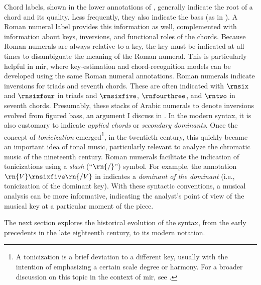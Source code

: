 

Chord labels, shown in the lower annotations of
, generally indicate the root of a chord and
its quality. Less frequently, they also indicate the bass
(as in ). A Roman numeral label provides
this information as well, complemented with information
about keys, inversions, and functional roles of the chords.
Because Roman numerals are always relative to a key, the key
must be indicated at all times to disambiguate the meaning
of the Roman numeral. This is particularly helpful in
\gls{mir}, where key-estimation and chord-recognition models
can be developed using the same Roman numeral annotations.
Roman numerals indicate inversions for triads and seventh
chords. These are often indicated with $\rnsix$ and
$\rnsixfour$ in triads and $\rnsixfive$, $\rnfourthree$, and
$\rntwo$ in seventh chords. Presumably, these stacks of
Arabic numerals to denote inversions evolved from figured
bass, an argument I discuss in
. In the modern
syntax, it is also customary to indicate \emph{applied
chords} or \emph{secondary dominants}. Once the concept of
\emph{tonicization} emerged\footnote{A tonicization is a
brief deviation to a different key, usually with the
intention of emphasizing a certain scale degree or harmony.
For a broader discussion on this topic in the context of
\gls{mir}, see \textcite{napoleslopez2020local}.}, in the
twentieth century, this quickly became an important idea of
tonal music, particularly relevant to analyze the chromatic
music of the nineteenth century. Roman numerals facilitate
the indication of tonicizations using a \emph{slash}
(``$\rn{/}$'') symbol. For example, the annotation
$\rn{V}\rnsixfive\rn{/V}$ in  indicates a
\emph{dominant of the dominant} (i.e., tonicization of the
dominant key). With these syntactic conventions, a musical
analysis can be more informative, indicating the analyst's
point of view of the musical key at a particular moment of
the piece.

The next section explores the historical evolution of the
syntax, from the early precedents in the late eighteenth
century, to its modern notation.

